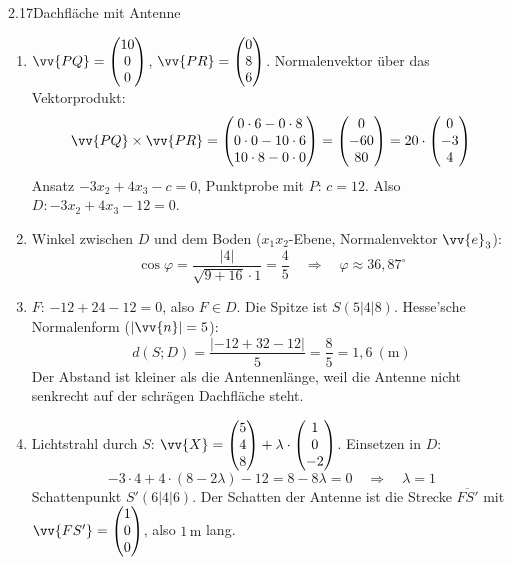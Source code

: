 
\begin{loesung}{2.17}{Dachfläche mit Antenne}
\begin{enumerate}[label=\alph*)]
  \item $\vv{PQ} = \begin{pmatrix} 10\\ 0\\ 0\end{pmatrix}$, $\vv{PR} = \begin{pmatrix} 0\\ 8\\ 6\end{pmatrix}$. Normalenvektor über das Vektorprodukt:
  \[\vv{PQ}\times\vv{PR} = \begin{pmatrix} 0\cdot 6-0\cdot 8\\ 0\cdot 0-10\cdot 6\\ 10\cdot 8-0\cdot 0\end{pmatrix} = \begin{pmatrix} 0\\ -60\\ 80\end{pmatrix} = 20\cdot\begin{pmatrix} 0\\ -3\\ 4\end{pmatrix}\]
  Ansatz $-3x_2+4x_3-c = 0$, Punktprobe mit $P$: $c = 12$. Also $D: -3x_2+4x_3-12 = 0$.
  \item Winkel zwischen $D$ und dem Boden ($x_1x_2$-Ebene, Normalenvektor $\vv{e}_3$):
  \[\cos{\varphi} = \dfrac{|4|}{\sqrt{9+16}\cdot 1} = \dfrac{4}{5}\quad\Longrightarrow\quad\varphi\approx 36{,}87^{\circ}\]
  \item $F$: $-12+24-12 = 0$, also $F\in D$. Die Spitze ist $S(5|4|8)$. Hesse'sche Normalenform ($|\vv{n}| = 5$):
  \[d(S;D) = \dfrac{|-12+32-12|}{5} = \dfrac{8}{5} = 1{,}6\ (\text{m})\]
  Der Abstand ist kleiner als die Antennenlänge, weil die Antenne nicht senkrecht auf der schrägen Dachfläche steht.
  \item Lichtstrahl durch $S$: $\vv{X} = \begin{pmatrix} 5\\ 4\\ 8\end{pmatrix}+\lambda\cdot\begin{pmatrix} 1\\ 0\\ -2\end{pmatrix}$. Einsetzen in $D$:
  \[-3\cdot 4+4\cdot(8-2\lambda)-12 = 8-8\lambda = 0\quad\Longrightarrow\quad\lambda = 1\]
  Schattenpunkt $S'(6|4|6)$. Der Schatten der Antenne ist die Strecke $\overline{FS'}$ mit $\vv{FS'} = \begin{pmatrix} 1\\ 0\\ 0\end{pmatrix}$, also $1\,\text{m}$ lang.
\end{enumerate}
\end{loesung}

